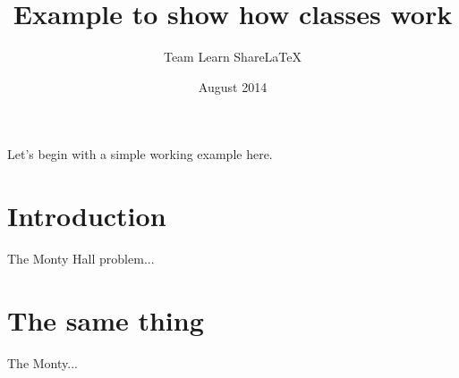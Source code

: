 \documentclass[red]{exaclass}
\title{Example to show how classes work}
\author{Team Learn ShareLaTeX}
\date{August 2014}
\begin{document}
\maketitle

\noindent
Let's begin with a simple working example here.

\blindtext

\section{Introduction}

The Monty Hall problem...

\section{The same thing}

The Monty...
\end{document}
